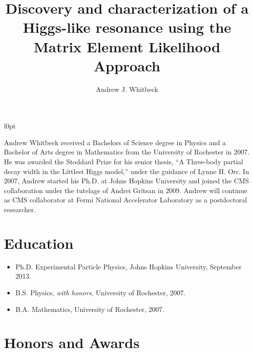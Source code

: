 \documentclass[12pt,oneside,final]{thesis}
\begin{document}
\title{Discovery and characterization of a Higgs-like resonance
using the Matrix Element Likelihood Approach}
\author{Andrew J. Whitbeck}
\dissertation
\doctorphilosophy
\copyrightnotice











%





\begin{vita}

\begin{wrapfigure}{l}{0pt}
\end{wrapfigure}

Andrew Whitbeck received a Bachelors of Science degree in
Physics and a Bachelor of Arts degree in Mathematics from
the University of Rochester in 2007.  He was awarded the
Stoddard Prize for his senior thesis, ``A Three-body partial
decay width in the Littlest Higgs model,'' under the guidance
of Lynne H. Orr.  In 2007, Andrew
started his Ph.D. at Johns Hopkins University and joined the
CMS collaboration under the tutelage of Andrei Gritsan in 2009.
Andrew will continue as CMS collaborator at Fermi National 
Accelerator Laboratory as a postdoctoral researcher. 

\section*{Education}

\begin{itemize}
  \item Ph.D. Experimental Particle Physics, Johns Hopkins University, September 2013.
  \item B.S. Physics, \textit{with honors}, University of Rochester, 2007.
  \item B.A. Mathematics, University of Rochester, 2007.
\end{itemize}

\section*{Honors and Awards}


\end{vita}
\end{document}

